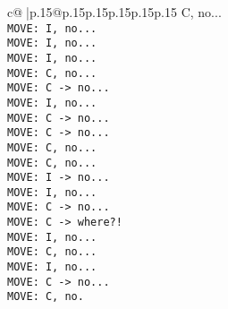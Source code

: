 \documentclass{article}
\begin{document}
{\begin{supertabular}{c@{$\;$}|p{.15\linewidth}@{}p{.15\linewidth}p{.15\linewidth}p{.15\linewidth}p{.15\linewidth}p{.15\linewidth}}
{{{ C, no...\\ \tt  MOVE: I, no...\\ \tt  MOVE: I, no...\\ \tt  MOVE: I, no...\\ \tt  MOVE: C, no...\\ \tt  MOVE: C -> no...\\ \tt  MOVE: I, no...\\ \tt  MOVE: C -> no...\\ \tt  MOVE: C -> no...\\ \tt  MOVE: C, no...\\ \tt  MOVE: C, no...\\ \tt  MOVE: I -> no...\\ \tt  MOVE: I, no...\\ \tt  MOVE: C -> no...\\ \tt  MOVE: C -> where?!\\ \tt  MOVE: I, no...\\ \tt  MOVE: C, no...\\ \tt  MOVE: I, no...\\ \tt  MOVE: C -> no...\\ \tt  MOVE: C, no.}}}
\end{supertabular}}
\end{document}
